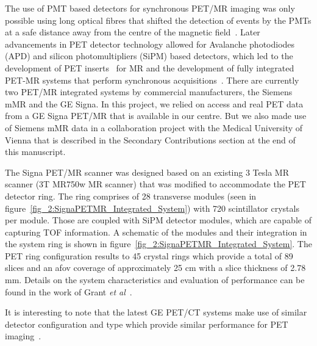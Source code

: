 The use of PMT based detectors for synchronous PET/MR imaging was only possible using long optical fibres that shifted the detection of events by the PMTs at a safe distance away from the centre of the magnetic field~\cite{Shao1997,Mackewn2010}. Later advancements in PET detector technology allowed for Avalanche photodiodes (APD) and silicon photomultipliers (SiPM) based detectors, which led to the development of PET inserts~\cite{Kolb2012} for MR and the development of fully integrated PET-MR systems that perform synchronous acquisitions~\cite{Delso2011,Grant2016,Levin2016}.
There are currently two PET/MR integrated systems by commercial manufacturers, the Siemens mMR and the GE Signa. In this project, we relied on access and real PET data from a GE Signa PET/MR that is available in our centre. But we also made use of Siemens mMR data in a collaboration project with the Medical University of Vienna that is described in the Secondary Contributions section at the end of this manuscript. 

The Signa PET/MR scanner was designed based on an existing 3 Tesla MR scanner (3T MR750w MR scanner) that was modified to accommodate the PET detector ring. The ring comprises of 28 transverse modules (seen in figure~\ref{fig_2:SignaPETMR_Integrated_System}) with 720 scintillator crystals per module. Those are coupled with SiPM detector modules, which are capable of capturing TOF information. A schematic of the modules and their integration in the system ring is shown in figure~\ref{fig_2:SignaPETMR_Integrated_System}. The PET ring configuration results to 45 crystal rings which provide a total of 89 slices and an \gls{afov} coverage of approximately 25 cm with a slice thickness of 2.78 mm. Details on the system characteristics and evaluation of performance can be found in the work of Grant \textit{et al}~\cite{Grant2016}.

It is interesting to note that the latest GE PET/CT systems make use of similar detector configuration and type which provide similar performance for PET imaging~\cite{Pan2019}.

